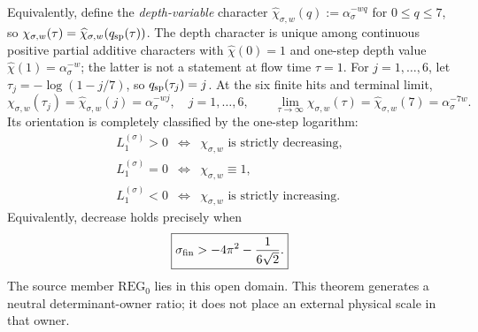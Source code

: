 \documentclass[12pt,a4paper]{article}
\begin{document}
\begin{theorem}
Equivalently, define the \emph{depth-variable} character
\(\widehat\chi_{\sigma,w}(q):=\alpha_\sigma^{-wq}\) for
\(0\le q\le7\), so
\(\chi_{\sigma,w}(\tau)=\widehat\chi_{\sigma,w}(q_{\rm sp}(\tau))\).
The depth character is unique among continuous positive partial additive
characters with \(\widehat\chi(0)=1\) and one-step depth value
\(\widehat\chi(1)=\alpha_\sigma^{-w}\); the latter is not a
statement at flow time \(\tau=1\). For \(j=1,\ldots,6\), let
\(\tau_j=-\log(1-j/7)\), so \(q_{\rm sp}(\tau_j)=j\).
At the six finite hits and terminal limit,
\begin{equation}
\label{p3c:eq:generated-dual-scale-levels}
 \chi_{\sigma,w}(\tau_j)
 =\widehat\chi_{\sigma,w}(j)=\alpha_\sigma^{-wj},
 \quad j=1,\ldots,6,
 \qquad
 \lim_{\tau\to\infty}\chi_{\sigma,w}(\tau)
 =\widehat\chi_{\sigma,w}(7)=\alpha_\sigma^{-7w}.
\end{equation}
Its orientation is completely classified by the one-step logarithm:
\begin{equation}
\label{p3c:eq:dual-hierarchy-orientation-trichotomy}
 \begin{array}{ccl}
 L_1^{(\sigma)}>0 &\Longleftrightarrow&
   \chi_{\sigma,w}\text{ is strictly decreasing},\\
 L_1^{(\sigma)}=0 &\Longleftrightarrow&
   \chi_{\sigma,w}\equiv1,\\
 L_1^{(\sigma)}<0 &\Longleftrightarrow&
   \chi_{\sigma,w}\text{ is strictly increasing}.
 \end{array}
\end{equation}
Equivalently, decrease holds precisely when
\begin{equation}
\label{p3c:eq:positive-reg-domain}
 \boxed{\sigma_{\rm fin}>
 -4\pi^2-\frac1{6\sqrt2}.}
\end{equation}
The source member \(\mathrm{REG}_0\) lies in this open domain.  This theorem
generates a neutral determinant-owner ratio; it does not place an external
physical scale in that owner.
\end{theorem}
\end{document}
